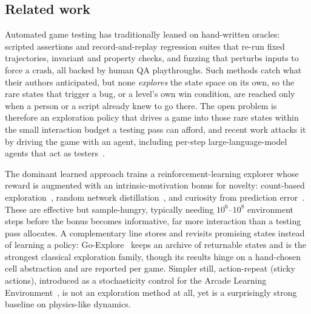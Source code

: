 %   
\subsection{Related work}
\label{sec:related}
Automated game testing has traditionally leaned on hand-written oracles: scripted assertions and record-and-replay
regression suites that re-run fixed trajectories, invariant and property checks, and fuzzing that perturbs inputs to
force a crash, all backed by human QA playthroughs. Such methods catch what their authors anticipated, but none
\emph{explores} the state space on its own, so the rare states that trigger a bug, or a level's own win condition, are
reached only when a person or a script already knew to go there. The open problem is therefore an exploration policy that
drives a game into those rare states within the small interaction budget a testing pass can afford, and recent work
attacks it by driving the game with an agent, including per-step large-language-model agents that act as
testers~\citep{titan}.

The dominant learned approach trains a reinforcement-learning explorer whose reward is augmented with an
intrinsic-motivation bonus for novelty: count-based exploration~\citep{tang2017}, random network
distillation~\citep{rnd}, and curiosity from prediction error~\citep{icm}. These are effective but sample-hungry,
typically needing $10^6$--$10^8$ environment steps before the bonus becomes informative, far more interaction than a
testing pass allocates. A complementary line stores and revisits promising states instead of learning a policy:
Go-Explore~\citep{goexplore} keeps an archive of returnable states and is the strongest classical exploration family,
though its results hinge on a hand-chosen cell abstraction and are reported per game. Simpler still, action-repeat
(sticky actions), introduced as a stochasticity control for the Arcade Learning Environment~\citep{machado2018}, is not
an exploration method at all, yet is a surprisingly strong baseline on physics-like dynamics.

